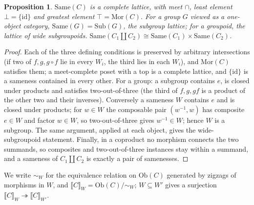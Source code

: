 \documentclass[11pt]{amsart}
\newtheorem{prop}[thm]{Proposition}
\theoremstyle{definition}
\newcommand{\Same}{\mathrm{Same}}
\newcommand{\Sub}{\mathrm{Sub}}
\newcommand{\Mor}{\mathrm{Mor}}
\newcommand{\Ob}{\mathrm{Ob}}
\begin{document}
\begin{prop}\label{prop:same}
$\Same(C)$ is a complete lattice, with meet $\cap$, least element
$\bot=\{\mathrm{id}\}$ and greatest element $\top=\Mor(C)$. For a group $G$
viewed as a one-object category, $\Same(G)=\Sub(G)$, the subgroup lattice; for
a groupoid, the lattice of wide subgroupoids. $\Same(C_1\amalg C_2)\cong
\Same(C_1)\times\Same(C_2)$.
\end{prop}
\begin{proof}
Each of the three defining conditions is preserved by arbitrary intersections
(if two of $f,g,g\circ f$ lie in every $W_i$, the third lies in each $W_i$), and
$\Mor(C)$ satisfies them; a meet-complete poset with a top is a complete
lattice, and $\{\mathrm{id}\}$ is a sameness contained in every other. For a
group: a subgroup contains $e$, is closed under products and satisfies
two-out-of-three (the third of $f,g,gf$ is a product of the other two and
their inverses). Conversely a sameness $W$ contains $e$ and is closed under
products; for $w\in W$ the composable pair $(w^{-1},w)$ has composite $e\in W$
and factor $w\in W$, so two-out-of-three gives $w^{-1}\in W$; hence $W$ is a
subgroup. The same argument, applied at each object, gives the wide-subgroupoid
statement. Finally, in a coproduct no morphism connects the two summands, so
composites and two-out-of-three instances stay within a summand, and a sameness
of $C_1\amalg C_2$ is exactly a pair of samenesses.
\end{proof}

We write $\sim_W$ for the equivalence relation on $\Ob(C)$ generated by
zigzags of morphisms in $W$, and $\llbracket C\rrbracket_W=\Ob(C)/{\sim_W}$;
$W\subseteq W'$ gives a surjection $\llbracket C\rrbracket_W\twoheadrightarrow
\llbracket C\rrbracket_{W'}$.
\end{document}
